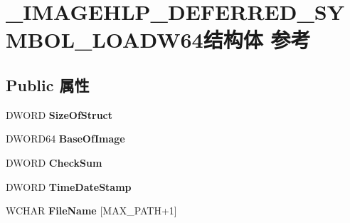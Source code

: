 \hypertarget{struct___i_m_a_g_e_h_l_p___d_e_f_e_r_r_e_d___s_y_m_b_o_l___l_o_a_d_w64}{}\section{\+\_\+\+I\+M\+A\+G\+E\+H\+L\+P\+\_\+\+D\+E\+F\+E\+R\+R\+E\+D\+\_\+\+S\+Y\+M\+B\+O\+L\+\_\+\+L\+O\+A\+D\+W64结构体 参考}
\label{struct___i_m_a_g_e_h_l_p___d_e_f_e_r_r_e_d___s_y_m_b_o_l___l_o_a_d_w64}
\subsection*{Public 属性}
\begin{DoxyCompactItemize}
\item 
\mbox{\label{struct___i_m_a_g_e_h_l_p___d_e_f_e_r_r_e_d___s_y_m_b_o_l___l_o_a_d_w64_a0b6d6d32e4d21a90454a2b47f84cb582}} 
D\+W\+O\+RD {\bfseries Size\+Of\+Struct}
\item 
\mbox{\label{struct___i_m_a_g_e_h_l_p___d_e_f_e_r_r_e_d___s_y_m_b_o_l___l_o_a_d_w64_a4e86f874f86554ae165c1a78374a4d43}} 
D\+W\+O\+R\+D64 {\bfseries Base\+Of\+Image}
\item 
\mbox{\label{struct___i_m_a_g_e_h_l_p___d_e_f_e_r_r_e_d___s_y_m_b_o_l___l_o_a_d_w64_a557c679313b9b914a913f9db4270d2a9}} 
D\+W\+O\+RD {\bfseries Check\+Sum}
\item 
\mbox{\label{struct___i_m_a_g_e_h_l_p___d_e_f_e_r_r_e_d___s_y_m_b_o_l___l_o_a_d_w64_afa574aa997a0be408934e024cc844510}} 
D\+W\+O\+RD {\bfseries Time\+Date\+Stamp}
\item 
\mbox{\label{struct___i_m_a_g_e_h_l_p___d_e_f_e_r_r_e_d___s_y_m_b_o_l___l_o_a_d_w64_a9820e15bff075cff71ae6c91425f6014}} 
W\+C\+H\+AR {\bfseries File\+Name} \mbox{[}M\+A\+X\+\_\+\+P\+A\+TH+1\mbox{]}

\end{DoxyCompactItemize}
